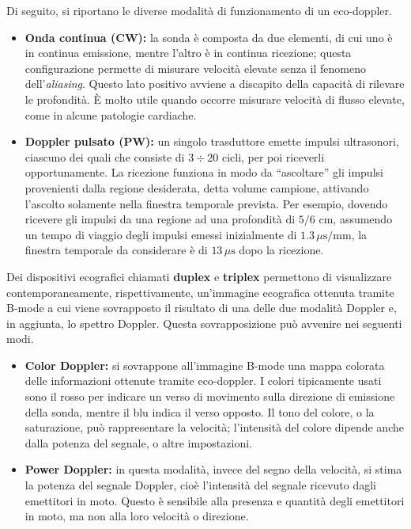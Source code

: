 \documentclass[11pt, a4paper]{scrartcl}
\theoremstyle{style}
\theoremstyle{style1}
\numberwithin{equation}{subsection}
\begin{document}
Di seguito, si riportano le diverse modalit\`a di funzionamento di un eco-doppler.
\begin{itemize}
	\item \textbf{Onda continua (CW):} la sonda \`e composta da due elementi, di cui uno \`e in continua emissione, mentre l'altro \`e in continua ricezione; questa configurazione permette di misurare velocit\`a elevate senza il fenomeno dell'\textit{aliasing}.
Questo lato positivo avviene a discapito della capacit\`a di rilevare le profondit\`a.
		\`E molto utile quando occorre misurare velocit\`a di flusso elevate, come in alcune patologie cardiache.
	\item \textbf{Doppler pulsato (PW):} un singolo trasduttore emette impulsi ultrasonori, ciascuno dei quali che consiste di $3\div 20$ cicli, per poi riceverli opportunamente. 
		La ricezione funziona in modo da ``ascoltare'' gli impulsi provenienti dalla regione desiderata, detta volume campione, attivando l'ascolto solamente nella finestra temporale prevista. 
		Per esempio, dovendo ricevere gli impulsi da una regione ad una profondit\`a di $5/6$ cm, assumendo un tempo di viaggio degli impulsi emessi inizialmente di $1.3\, \mu \text{s}/\text{mm}$, la finestra temporale da considerare \`e di $13\, \mu \text{s}$ dopo la ricezione.
\end{itemize}
Dei dispositivi ecografici chiamati \textbf{duplex} e \textbf{triplex} permettono di visualizzare contemporaneamente, rispettivamente, un'immagine ecografica ottenuta tramite B-mode a cui viene sovrapposto il risultato di una delle due modalit\`a Doppler e, in aggiunta, lo spettro Doppler.
Questa sovrapposizione pu\`o avvenire nei seguenti modi.
\begin{itemize}
	\item \textbf{Color Doppler:} si sovrappone all'immagine B-mode una mappa colorata delle informazioni ottenute tramite eco-doppler.
		I colori tipicamente usati sono il rosso per indicare un verso di movimento sulla direzione di emissione della sonda, mentre il blu indica il verso opposto.
		Il tono del colore, o la saturazione, pu\`o rappresentare la velocit\`a; l'intensit\`a del colore dipende anche dalla potenza del segnale, o altre impostazioni.
	\item \textbf{Power Doppler:} in questa modalit\`a, invece del segno della velocit\`a, si stima la potenza del segnale Doppler, cio\`e l'intensit\`a del segnale ricevuto dagli emettitori in moto.
		Questo \`e sensibile alla presenza e quantit\`a degli emettitori in moto, ma non alla loro velocit\`a o direzione.
\end{itemize}
\end{document}
